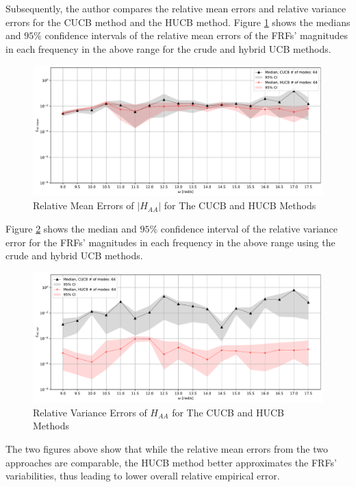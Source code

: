 Subsequently, the author compares the relative mean errors and relative variance errors for the CUCB method and the HUCB method.
Figure \ref{e_mean HUCB_A_A} shows the medians and $95\%$ confidence intervals of the relative mean errors of the FRFs' magnitudes in each frequency in the above range for the crude and hybrid UCB methods.
\begin{figure}[H]
    \centering
    \includegraphics[width=1.0\textwidth]{
        plots/substructuring/plot_6.pdf
    }
    \caption{%
        Relative Mean Errors of $\left|H_{AA}\right|$ for The CUCB and HUCB Methods
    }
    \label{e_mean HUCB_A_A}
\end{figure}
Figure \ref{e_var HUCB_A_A} shows the median and $95\%$ confidence interval of the relative variance error for the FRFs' magnitudes in each frequency in the above range using the crude and hybrid UCB methods.
\begin{figure}[H]
    \centering
    \includegraphics[width=1.0\textwidth]{
        plots/substructuring/plot_7.pdf
    }
    \caption{%
        Relative Variance Errors of $H_{AA}$ for The CUCB and HUCB Methods
    }
    \label{e_var HUCB_A_A}
\end{figure}
The two figures above show that while the relative mean errors from the two approaches are comparable, the HUCB method better approximates the FRFs' variabilities, thus leading to lower overall relative empirical error.